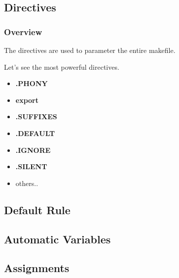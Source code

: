\documentclass[8pt]{beamer}
\newcommand{\nl}[0]{\vspace{0.4cm}}
\begin{document}
%
%

\subsection{Directives}


\begin{frame}
  \frametitle{Overview}

  The directives are used to parameter the entire makefile.

  \nl

  Let's see the most powerful directives.

  \begin{itemize}[<+->]
    \item
      \textbf{.PHONY}
    \item
      \textbf{export}
    \item
      \textbf{.SUFFIXES}
    \item
      \textbf{.DEFAULT}
    \item
      \textbf{.IGNORE}
    \item
      \textbf{.SILENT}
    \item
      others..
  \end{itemize}
\end{frame}


\begin{frame}
  \frametitle{}

\end{frame}

\subsection{Default Rule}


\subsection{Automatic Variables}


\subsection{Assignments}

\end{document}
